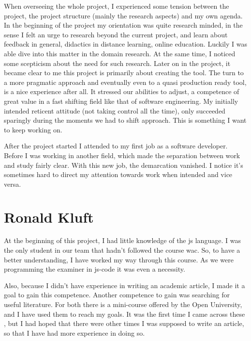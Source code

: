 When overseeing the whole project, I experienced some tension between the
project, the project structure (mainly the research aspects) and my own agenda.
In the beginning of the project my orientation was quite research minded, in the
sense I felt an urge to research beyond the current project, and learn about 
feedback in general, didactics in distance learning, online education. Luckily
I was able dive into this matter in the domain research. At the same time, I
noticed some scepticism about the need for such research. Later on in the 
project, it became clear to me this project is primarily about creating the 
tool. The turn to a more pragmatic approach and eventually even to a quasi 
production ready tool, is a nice experience after all. It stressed our 
abilities to adjust, a competence of great value in a fast shifting field like 
that of software engineering. My initially intended reticent attitude (not taking control all the time), only succeeded sparingly during the moments we had to shift approach. This is something I want to keep working on.

After the project started I attended to my first job as a software developer. 
Before I was working in another field, which made the separation between work 
and study fairly clear. With this new job, the demarcation vanished. I notice 
it's sometimes hard to direct my attention towards work when intended and vice 
versa. 


\section{Ronald Kluft}

At the beginning of this project, I had little knowledge of the \gls{js}
language. I was the only student in our team that hadn't followed the course
\gls{wac}. So, to have a better understanding, I have worked my way through
this course.
As we were programming the \gls{examiner} in \gls{js-code} it was even a necessity.

Also, because I didn't have experience in writing an academic article, I
made it a goal to gain this competence.
Another competence to gain was searching for useful literature.
For both there is a mini-course offered by the Open University, and I have
used them to reach my goals.
It was the first time I came across these , but I had hoped that there were
other times I was supposed to write an article, so that I have had more
experience in doing so.

